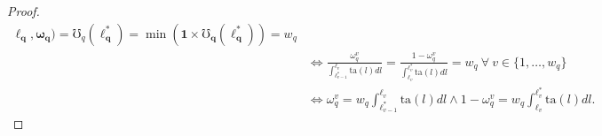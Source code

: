 \documentclass[hidelinks, nonatbib]{elsarticle}
\begin{document}
\begin{lemma}
\begin{proof}
\begin{align}
                \boldsymbol{\ell_q}
                ,\boldsymbol{\omega_q}
            ) 
            =
            \mho_{q}(
                \boldsymbol{\ell_{q}^{*}}
            ) 
            = 
            \min(
                \boldsymbol{1}
                \times
                \boldsymbol{\mho_q}(
                    \boldsymbol{\ell_{q}^{*}}
                )
            )
            =
            w_q
            \\
            &\iff
            \frac{
                \omega_{q}^{v}
            }{
                \int_{
                    \ell_{v-1}^{*}
                }^{
                    \ell_{v}
                }{
                    \text{ta}(l)dl
                }
            }
            =
            \frac{
                1 - \omega_{q}^{v}
            }{
                \int_{
                    \ell_{v}
                }^{
                    \ell_{v}^{*}
                }{
                    \text{ta}(l)dl
                }
            }
            =
            w_q
            \
            \forall
            \
            v \in \{1, \dots, w_q\}
            \\
            &\iff
            \omega_{q}^{v}
            =
            w_q
            \int_{
                \ell_{v-1}^{*}
            }^{
                \ell_{v}
            }{
                \text{ta}(l)
                dl
            }
            \land
            1 - \omega_{q}^{v}
            =
            w_q
            \int_{
                \ell_{v}
            }^{
                \ell_{v}^{*}
            }{
                \text{ta}(l)
                dl
            }
            .
        \end{align}

\end{proof}
\end{lemma}
\end{document}
